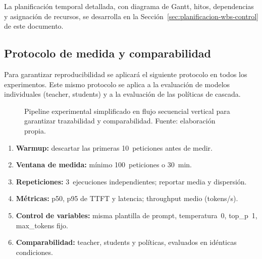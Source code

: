 La planificación temporal detallada, con diagrama de Gantt, hitos, dependencias y asignación de recursos, se desarrolla en la Sección~\ref{sec:planificacion-wbs-control} de este documento.

\subsection{Protocolo de medida y comparabilidad}

Para garantizar reproducibilidad se aplicará el siguiente protocolo en todos los experimentos. Este mismo protocolo se aplica a la evaluación de modelos individuales (teacher, students) y a la evaluación de las políticas de cascada.

\begin{figure}[H]
\centering
{}
\caption{Pipeline experimental simplificado en flujo secuencial vertical para garantizar trazabilidad y comparabilidad. Fuente: elaboración propia.}
\label{fig:pipeline-experimental}
\end{figure}

\begin{enumerate}[nosep,leftmargin=*]
\item \textbf{Warmup:} descartar las primeras 10~peticiones antes de medir.
\item \textbf{Ventana de medida:} mínimo 100~peticiones o 30~min.
\item \textbf{Repeticiones:} 3~ejecuciones independientes; reportar media y dispersión.
\item \textbf{Métricas:} p50, p95 de TTFT y latencia; throughput medio (tokens/s).
\item \textbf{Control de variables:} misma plantilla de prompt, temperatura~0, top\_p~1, max\_tokens fijo.
\item \textbf{Comparabilidad:} teacher, students y políticas, evaluados en idénticas condiciones.
\end{enumerate}

